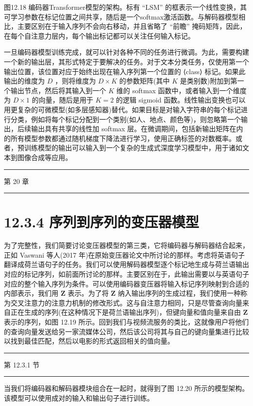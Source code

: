 \documentclass[10pt]{report}
\newcommand{\HRule}{\begin{center}\rule{0.9\linewidth}{0.2mm}\end{center}}
\begin{document}
图12.18 编码器Transformer模型的架构。标有 “LSM” 的框表示一个线性变换，其可学习参数在标记位置之间共享，随后是一个softmax激活函数。与解码器模型相比，主要区别在于输入序列不会向右移动，并且省略了 “前瞻” 掩码矩阵，因此，在每个自注意力层内，每个输出标记都可以关注任何输入标记。

一旦编码器模型训练完成，就可以针对各种不同的任务进行微调。为此，需要构建一个新的输出层，其形式特定于要解决的任务。对于文本分类任务，仅使用第一个输出位置，该位置对应于始终出现在输入序列第一个位置的 ⟨class⟩ 标记。如果此输出的维度为 \(D\) ，则将维度为 \(D \times  K\) 的参数矩阵(其中 \(K\) 是类别数)附加到第一个输出节点，然后将其输入到一个 \(K\) 维的 softmax 函数中，或者输入到一个维度为 \(D \times  1\) 的向量，随后是用于 \(K = 2\) 的逻辑 sigmoid 函数。线性输出变换也可以用更复杂的可微模型(如多层感知器)替代。如果目标是对输入字符串的每个标记进行分类，例如将每个标记分配到一个类别(如人、地点、颜色等)，则忽略第一个输出，后续输出具有共享的线性加 softmax 层。在微调期间，包括新输出矩阵在内的所有模型参数都通过随机梯度下降法进行学习，使用正确标签的对数概率。或者，预训练模型的输出可以输入到一个复杂的生成式深度学习模型中，用于诸如文本到图像合成等应用。

\HRule

第 20 章

\HRule

\section*{12.3.4 序列到序列的变压器模型}

为了完整性，我们简要讨论变压器模型的第三类，它将编码器与解码器结合起来，正如 Vaswani 等人(2017 年)在原始变压器论文中所讨论的那样。考虑将英语句子翻译成荷兰语句子的任务。我们可以使用解码器模型逐个标记地生成与荷兰语输出对应的标记序列，如前面所讨论的那样。主要区别在于，此输出需要以与英语句子对应的整个输入序列为条件。可以使用编码器变压器将输入标记序列映射到合适的内部表示，我们用 \(\mathbf{Z}\) 表示。为了将 \(\mathbf{Z}\) 纳入输出序列的生成过程，我们使用一种称为交叉注意力的注意力机制的修改形式。这与自注意力相同，只是尽管查询向量来自正在生成的序列(在这种情况下是荷兰语输出序列)，但键向量和值向量来自由 \(\mathbf{Z}\) 表示的序列，如图 12.19 所示。回到我们与视频流服务的类比，这就像用户将他们的查询向量发送给另一家流媒体公司，然后该公司将其与自己的键向量集进行比较以找到最佳匹配，然后以电影的形式返回相关的值向量。

\HRule

第 12.3.1 节

\HRule

当我们将编码器和解码器模块组合在一起时，就得到了图 12.20 所示的模型架构。该模型可以使用成对的输入和输出句子进行训练。
\end{document}
